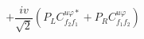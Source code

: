 %
\begin{dmath*}
%
  +  \frac{i v}{\sqrt{2}} \left(P_L C^{u \varphi  *}_{f_2 f_1} + P_R C^{u \varphi  }_{f_1 f_2}\right)
%
\end{dmath*}
%
